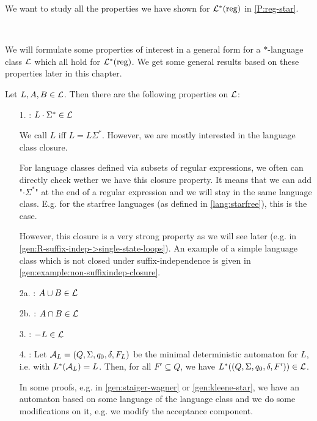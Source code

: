 We want to study all the properties we have shown for $\mathcal{L}^*(\textup{\textrm{reg}})$ in \cref{P:reg-star}.

\

We will formulate some properties of interest in a general form for a $*$-language class $\mathcal{L}$ which all hold for $\mathcal{L}^*(\textup{\textrm{reg}})$. We get some general results based on these properties later in this chapter. %

Let $L,A,B \in \mathcal{L}$. Then there are the following properties on $\mathcal{L}$:
\begin{enumerate}
\item[1.] : $L \cdot \Sigma^* \in \mathcal{L}$

We call $L$  iff $L = L \Sigma^*$. However, we are mostly interested in the language class closure.

For language classes defined via subsets of regular expressions, we often can directly check wether we have this closure property. It means that we can add "$\cdot\Sigma^*$" at the end of a regular expression and we will stay in the same language class. E.g. for the starfree languages (as defined in \cref{lang:starfree}), this is the case.

However, this closure is a very strong property as we will see later (e.g. in \cref{gen:R-suffix-indep->single-state-loops}). An example of a simple language class which is not closed under suffix-independence is given in \cref{gen:example:non-suffixindep-closure}.

\item[2a.] : $A \cup B \in \mathcal{L}$
\item[2b.] : $A \cap B \in \mathcal{L}$
\item[3.] : $- L \in \mathcal{L}$

\item[4.]
:
Let $\mathcal{A}_L = (Q,\Sigma,q_0,\delta,F_L)$ be the minimal deterministic automaton for $L$, i.e. with $L^*(\mathcal{A}_L) = L$. Then, for all $F' \subseteq Q$, we have $L^*((Q,\Sigma,q_0,\delta,F')) \in \mathcal{L}$.

In some proofs, e.g. in \cref{gen:staiger-wagner} or \cref{gen:kleene-star}, we have an automaton based on some language of the language class and we do some modifications on it, e.g. we modify the acceptance component.


\end{enumerate}
